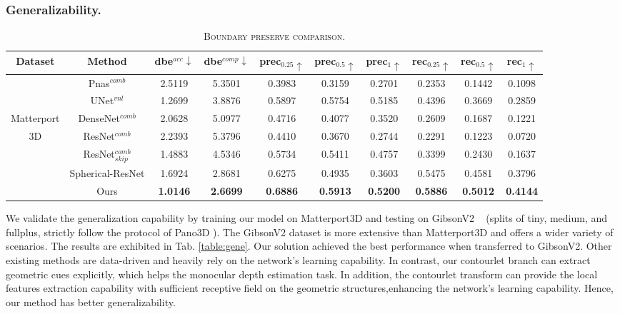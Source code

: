 \documentclass[10pt,times,mathptm,psfig,twocolumn,journals]{IEEEtran}
\begin{document}
\subsubsection{Generalizability.}
\begin{table*}[t]
\begin{center}
\caption{\textsc{Boundary preserve comparison.}}
\label{table:bp}
\begin{tabular}{cccccccccc}
\hline\noalign{\smallskip}
Dataset&Method & dbe$^{acc}\downarrow$ & dbe$^{comp}\downarrow$ & prec$_{0.25}\uparrow$ & prec$_{0.5}\uparrow$ & prec$_{1}\uparrow$ & rec$_{0.25}\uparrow$ & rec$_{0.5}\uparrow$ & rec$_{1}\uparrow$\\
\hline\noalign{\smallskip}
\hline
&Pnas$^{comb}$\cite{albanis2021pano3d}       & 2.5119  & 5.3501 & 0.3983 & 0.3159 & 0.2701 &0.2353 &0.1442 &0.1098     \\
&UNet$^{vnl}$\cite{albanis2021pano3d} & 1.2699  & 3.8876 & 0.5897 & 0.5754 & 0.5185 &0.4396 &0.3669 &0.2859      \\
Matterport&DenseNet$^{comb}$\cite{albanis2021pano3d}    & 2.0628  & 5.0977 & 0.4716 & 0.4077 & 0.3520 &0.2609 &0.1687 &0.1221     \\
3D&ResNet$^{comb}$\cite{albanis2021pano3d}    & 2.2393  & 5.3796 & 0.4410 & 0.3670 & 0.2744 &0.2291 &0.1223 &0.0720    \\
&ResNet$^{comb}_{skip}$\cite{albanis2021pano3d} & 1.4883  & 4.5346 & 0.5734 & 0.5411 & 0.4757 &0.3399 &0.2430 &0.1637\\
&Spherical-ResNet & 1.6924  & 2.8681 & 0.6275 & 0.4935 & 0.3603 &0.5475 &0.4581 &0.3796\\
&Ours   & \textbf{1.0146} & \textbf{2.6699}  & \textbf{0.6886} & \textbf{0.5913} & \textbf{0.5200} & \textbf{0.5886} & \textbf{0.5012} & \textbf{0.4144}    \\
\hline
\end{tabular}
\end{center}
\end{table*} 
We validate the generalization capability by training our model on Matterport3D and testing on GibsonV2 ~\cite{Xia_2018_CVPR} (splits of tiny, medium, and fullplus, strictly follow the protocol of Pano3D \cite{albanis2021pano3d}). The GibsonV2 dataset is more extensive than Matterport3D and offers a wider variety of scenarios. The results are exhibited in Tab. \ref{table:gene}. Our solution achieved the best performance when transferred to GibsonV2. Other existing methods are data-driven and heavily rely on the network’s learning capability. In contrast, our contourlet branch can extract geometric cues explicitly, which helps the monocular depth estimation task. In addition, the contourlet transform can provide the local  features extraction capability with sufficient receptive field on the geometric structures,enhancing the network’s learning capability. Hence, our method has better generalizability.
 
\end{document}
